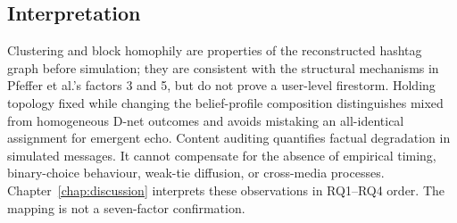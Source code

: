 \subsection{Interpretation}

Clustering and block homophily are properties of the reconstructed hashtag
graph before simulation; they are consistent with the structural mechanisms in
Pfeffer et al.'s factors 3 and 5, but do not prove a user-level firestorm.
Holding topology fixed while changing the belief-profile composition
distinguishes mixed from homogeneous D-net outcomes and avoids mistaking an
all-identical assignment for emergent echo. Content auditing quantifies
factual degradation in simulated messages. It cannot compensate for the
absence of empirical timing, binary-choice behaviour, weak-tie diffusion, or
cross-media processes. Chapter~\ref{chap:discussion} interprets these
observations in RQ1--RQ4 order. The mapping is not a seven-factor confirmation.
\fussy
